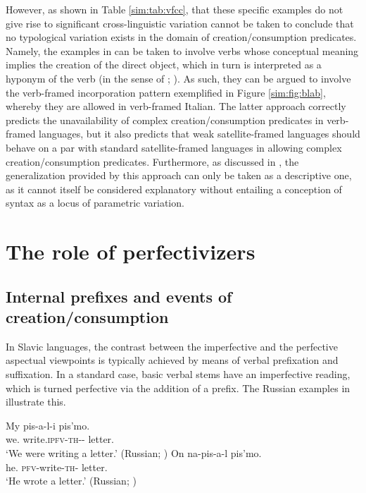 \documentclass[output=paper,colorlinks,citecolor=brown]{langscibook}
\begin{document}
{However, as shown in Table \ref{sim:tab:vfcc}, that these specific examples do not give rise to significant cross-linguistic variation cannot be taken to conclude that no typological variation exists in the domain of creation/consumption predicates. Namely, the examples in \citet{FolliAndHarley2020} can be taken to involve verbs whose conceptual meaning implies the creation of the direct object, which in turn is interpreted as a hyponym of the verb (in the sense of \citealt{HaleAndKeyser1997b}; \citeyear{HaleAndKeyser2002}). As such, they can be argued to involve the verb-framed incorporation pattern exemplified in Figure \ref{sim:fig:blab}, whereby they are allowed in verb-framed Italian.} The latter approach correctly predicts the unavailability of complex creation/consumption predicates in verb-framed languages, but it also predicts that weak satellite-framed languages should behave on a par with standard satellite-framed languages in allowing complex creation/consumption predicates. Furthermore, as discussed in , the generalization provided by this approach can only be taken as a descriptive one, as it cannot itself be considered explanatory without entailing a conception of syntax as a locus of parametric variation.


\section{The role of perfectivizers}\label{4}

\subsection{Internal prefixes and events of creation/consumption}\label{4.2}

In Slavic languages, the contrast between the imperfective and the perfective aspectual viewpoints is typically achieved by means of verbal prefixation and suffixation. In a standard case, basic verbal stems have an imperfective reading, which is turned perfective via the addition of a prefix. The Russian examples in  illustrate this.

\ea \label{Ruprefixsmith} \ea \gll My pis-a-l-i pis'mo.  \\ 
we.{\NOM} write.\textsc{ipfv}-\textsc{th}-{\PST}-{\AGR} letter.{\ACC} \\
\glt `We were writing a letter.'  \hfill (Russian; \citealt[302]{Smith1991})
\ex \label{Runaprefix} \gll On na-pis-a-l pis'mo. \\
he.{\NOM} \textsc{pfv}-write-\textsc{th}-{\PST} letter.{\ACC} \\
\glt `He wrote a letter.'  \hfill (Russian; \citealt[301]{Smith1991}) \z \z
\end{document}
